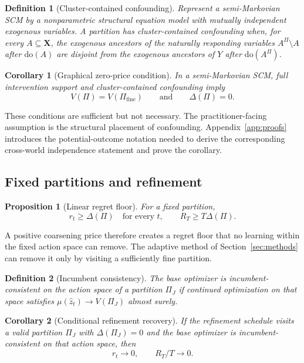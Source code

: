 \documentclass[twoside]{article}
\newtheorem{definition}{Definition}
\newtheorem{proposition}{Proposition}
\newtheorem{corollary}{Corollary}
\newcommand{\doo}{\mathrm{do}}
\begin{document}
\begin{definition}[Cluster-contained confounding]
\label{def:ccc}
Represent a semi-Markovian SCM by a nonparametric structural equation model with mutually independent exogenous variables. A partition has cluster-contained confounding when, for every \(A\subseteq\mathbf X\), the exogenous ancestors of the naturally responding variables \(A^\Pi\setminus A\) after \(\doo(A)\) are disjoint from the exogenous ancestors of \(Y\) after \(\doo(A^\Pi)\).
\end{definition}

\begin{corollary}[Graphical zero-price condition]
\label{cor:zero-price}
In a semi-Markovian SCM, full intervention support and cluster-contained confounding imply
\[
 V(\Pi)=V(\Pi_{\mathrm{fine}})
 \qquad\text{and}\qquad
 \Delta(\Pi)=0.
\]
\end{corollary}

These conditions are sufficient but not necessary. The practitioner-facing assumption is the structural placement of confounding. Appendix~\ref{app:proofs} introduces the potential-outcome notation needed to derive the corresponding cross-world independence statement and prove the corollary.

\subsection{Fixed partitions and refinement}
\label{sec:refinement}

\begin{proposition}[Linear regret floor]
\label{prop:floor}
For a fixed partition,
\[
 r_t\ge\Delta(\Pi)\quad\text{for every }t,
 \qquad
 R_T\ge T\Delta(\Pi).
\]
\end{proposition}

A positive coarsening price therefore creates a regret floor that no learning within the fixed action space can remove. The adaptive method of Section~\ref{sec:methods} can remove it only by visiting a sufficiently fine partition.

\begin{definition}[Incumbent consistency]
\label{def:consistency}
The base optimizer is incumbent-consistent on the action space of a partition \(\Pi_J\) if continued optimization on that space satisfies \(\mu(\hat z_t)\to V(\Pi_J)\) almost surely.
\end{definition}

\begin{corollary}[Conditional refinement recovery]
\label{cor:recovery}
If the refinement schedule visits a valid partition \(\Pi_J\) with \(\Delta(\Pi_J)=0\) and the base optimizer is incumbent-consistent on that action space, then
\[
 r_t\longrightarrow0,
 \qquad
 R_T/T\longrightarrow0.
\]
\end{corollary}
\end{document}
